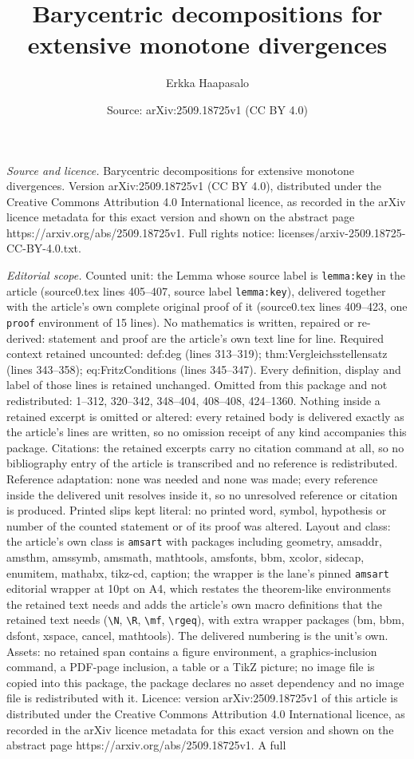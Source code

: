 \documentclass[10pt,a4paper]{amsart}
\title[Barycentric decompositions for extensive monotone divergence]{Barycentric decompositions for extensive monotone divergences}
\author{Erkka Haapasalo}
\date{Source: arXiv:2509.18725v1 (CC BY 4.0)}
\begin{document}
\maketitle

\noindent\emph{Source and licence.} Barycentric decompositions for extensive monotone divergences. Version arXiv:2509.18725v1 (CC BY 4.0), distributed under the Creative Commons Attribution 4.0 International licence, as recorded in the arXiv licence metadata for this exact version and shown on the abstract page https://arxiv.org/abs/2509.18725v1. Full rights notice: licenses/arxiv-2509.18725-CC-BY-4.0.txt.\par\smallskip

\noindent\textit{Editorial scope.} Counted unit: the Lemma whose source label is \texttt{lemma:key} in the article (source0.tex lines 405--407, source label \texttt{lemma:key}), delivered together with the article's own complete original proof of it (source0.tex lines 409--423, one \texttt{proof} environment of 15 lines). No mathematics is written, repaired or re-derived: statement and proof are the article's own text line for line. Required context retained uncounted: def:deg (lines 313--319); thm:Vergleichsstellensatz (lines 343--358); eq:FritzConditions (lines 345--347). Every definition, display and label of those lines is retained unchanged. Omitted from this package and not redistributed: 1--312, 320--342, 348--404, 408--408, 424--1360. Nothing inside a retained excerpt is omitted or altered: every retained body is delivered exactly as the article's lines are written, so no omission receipt of any kind accompanies this package. Citations: the retained excerpts carry no citation command at all, so no bibliography entry of the article is transcribed and no reference is redistributed. Reference adaptation: none was needed and none was made; every reference inside the delivered unit resolves inside it, so no unresolved reference or citation is produced. Printed slips kept literal: no printed word, symbol, hypothesis or number of the counted statement or of its proof was altered. Layout and class: the article's own class is \texttt{amsart} with packages including geometry, amsaddr, amsthm, amssymb, amsmath, mathtools, amsfonts, bbm, xcolor, sidecap, enumitem, mathabx, tikz-cd, caption; the wrapper is the lane's pinned \texttt{amsart} editorial wrapper at 10pt on A4, which restates the theorem-like environments the retained text needs and adds the article's own macro definitions that the retained text needs (\texttt{\textbackslash N}, \texttt{\textbackslash R}, \texttt{\textbackslash mf}, \texttt{\textbackslash rgeq}), with extra wrapper packages (bm, bbm, dsfont, xspace, cancel, mathtools). The delivered numbering is the unit's own. Assets: no retained span contains a figure environment, a graphics-inclusion command, a PDF-page inclusion, a table or a TikZ picture; no image file is copied into this package, the package declares no asset dependency and no image file is redistributed with it. Licence: version arXiv:2509.18725v1 of this article is distributed under the Creative Commons Attribution 4.0 International licence, as recorded in the arXiv licence metadata for this exact version and shown on the abstract page https://arxiv.org/abs/2509.18725v1. A full 
\end{document}
